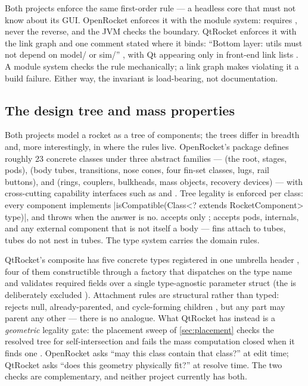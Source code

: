 \begin{designrule}
Both projects enforce the same first-order rule --- a headless core that must not know
about its GUI. OpenRocket enforces it with the module system:  requires
, never the reverse, and the JVM checks the boundary. QtRocket enforces it with
the link graph and one comment stated where it binds: ``Bottom layer: utils must not depend
on model/ or sim/'' , with Qt appearing only in front-end link
lists . A module system checks the rule mechanically; a link graph
makes violating it a build failure. Either way, the invariant is load-bearing, not
documentation.
\end{designrule}

\subsection{The design tree and mass properties}\label{app:or-architecture-tree}

Both projects model a rocket as a tree of components; the trees differ in breadth and,
more interestingly, in where the rules live. OpenRocket's
 package defines roughly 23 concrete classes
under three abstract families ---  (the  root, stages,
pods),  (body tubes, transitions, nose cones, four fin-set classes,
lugs, rail buttons), and  (rings, couplers, bulkheads, mass objects,
recovery devices) --- with cross-cutting capability interfaces such as  and
. Tree legality is enforced per class: every component implements
\cppinline|isCompatible(Class<? extends RocketComponent> type)|, and 
throws when the answer is no.  accepts only ; 
accepts pods, internals, and any external component that is not itself a body --- fins
attach to tubes, tubes do not nest in tubes. The type system carries the domain rules.

QtRocket's composite has five concrete  types registered in one umbrella header
, four of them constructible through a factory that dispatches
on the type name and validates required fields  over a
single type-agnostic parameter struct  (the 
is deliberately excluded ). Attachment rules are
structural rather than typed:  rejects null, already-parented, and
cycle-forming children , but any part may parent any other ---
there is no  analogue. What QtRocket has instead is a \emph{geometric}
legality gate: the placement sweep of \cref{sec:placement} checks the resolved tree for
self-intersection and fails the mass computation closed when it finds one
. OpenRocket asks ``may this class contain that class?'' at
edit time; QtRocket asks ``does this geometry physically fit?'' at resolve time. The two
checks are complementary, and neither project currently has both.

